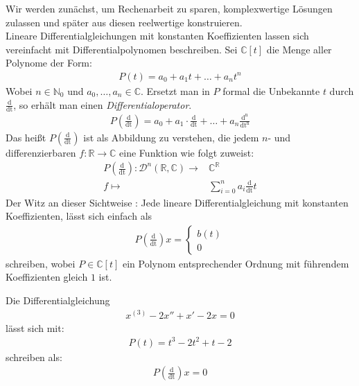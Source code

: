 \begin{Bemerkung}{
	Wir werden zunächst, um Rechenarbeit zu sparen, komplexwertige Lösungen zulassen 
	und später aus diesen reelwertige konstruieren. \\
	Lineare Differentialgleichungen mit konstanten Koeffizienten lassen sich 
	vereinfacht mit \glqq Differentialpolynomen\grqq{} beschreiben. 
	Sei $\mathbb{C}[t]$ die Menge aller Polynome der Form:
	\begin{align*}
		P(t) = a_0 + a_1t + \hdots + a_n t^n
	\end{align*}
	Wobei $n \in \mathbb{N}_0$ und $a_0, \hdots, a_n \in \mathbb{C}$. Ersetzt man in 
	$P$ formal die Unbekannte $t$ durch $\frac{\mathrm{d}}{\mathrm{dt}}$, so erhält 
	man einen \emph{Differentialoperator}.
	\begin{align*}
		P\left(\frac{\mathrm{d}}{\mathrm{dt}}\right) = a_0 + a_1 \cdot \frac{\mathrm{d}}{\mathrm{dt}} + \hdots + a_n \frac{\mathrm{d^n}}{\mathrm{dt^n}}
	\end{align*}
	Das heißt $P\left(\frac{\mathrm{d}}{\mathrm{dt}}\right)$ ist als Abbildung zu
	verstehen, die jedem $n$- und differenzierbaren $f: \mathbb{R} \rightarrow \mathbb{C}$ eine Funktion wie folgt zuweist:
	\begin{align*}
		P\left(\frac{\mathrm{d}}{\mathrm{dt}}\right) : 
		\mathcal{D}^n(\mathbb{R}, \mathbb{C}) \rightarrow & \mathbb{C}^{\mathbb{R}} \\
		f \mapsto & \sum_{i = 0}^n a_i \frac{\mathrm{d}}{\mathrm{dt}} t
	\end{align*}
	Der Witz an dieser Sichtweise : Jede lineare Differentialgleichung 
	mit konstanten Koeffizienten, lässt sich einfach als 
	\begin{align*}
		P \left( \frac{\mathrm{d}}{\mathrm{dt}} \right) x = 
		\begin{cases}	b(t) \\ 0 \end{cases}
	\end{align*}
	schreiben, wobei $P \in \mathbb{C}[t]$ ein Polynom entsprechender 
	Ordnung mit führendem Koeffizienten gleich $1$ ist.  
}\end{Bemerkung}

\begin{Beispiel}{
	Die Differentialgleichung 
	\begin{align*}
		x^{(3)} - 2x'' + x' - 2x = 0 
	\end{align*}
	lässt sich mit:
	\begin{align*}
		P(t) = t^3 - 2t^2+t-2
	\end{align*}		
	schreiben als:
	\begin{align*}
		P \left(\frac{\mathrm{d}}{\mathrm{dt}}\right)x = 0
	\end{align*}		
}\end{Beispiel}

